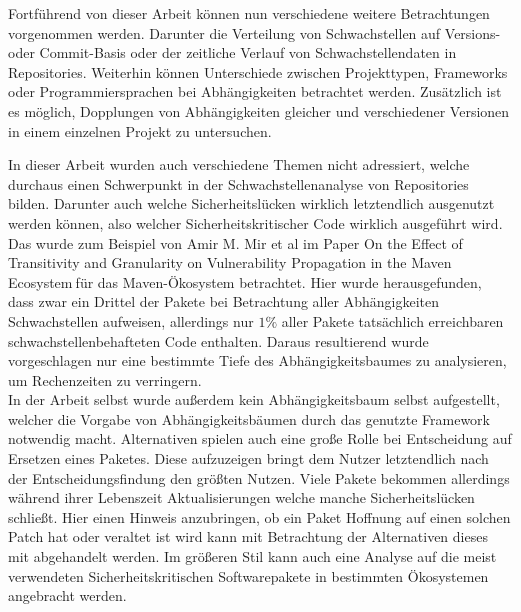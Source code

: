     Fortführend von dieser Arbeit können nun verschiedene weitere Betrachtungen vorgenommen werden.
    Darunter die Verteilung von Schwachstellen auf Versions- oder Commit-Basis oder der zeitliche Verlauf von Schwachstellendaten in Repositories.
    Weiterhin können Unterschiede zwischen Projekttypen, Frameworks oder Programmiersprachen bei Abhängigkeiten betrachtet werden.
    Zusätzlich ist es möglich, Dopplungen von Abhängigkeiten gleicher und verschiedener Versionen in einem einzelnen Projekt zu untersuchen.

    In dieser Arbeit wurden auch verschiedene Themen nicht adressiert, welche durchaus einen Schwerpunkt in der Schwachstellenanalyse von Repositories bilden.
    Darunter auch welche Sicherheitslücken wirklich letztendlich ausgenutzt werden können, also welcher Sicherheitskritischer Code wirklich ausgeführt wird.
    Das wurde zum Beispiel von Amir M. Mir et al im Paper \glqq On the Effect of Transitivity and Granularity on Vulnerability Propagation in the Maven Ecosystem\grqq$~$für das Maven-Ökosystem betrachtet.
    Hier wurde herausgefunden, dass zwar ein Drittel der Pakete bei Betrachtung aller Abhängigkeiten Schwachstellen aufweisen, allerdings nur $1\%$ aller Pakete tatsächlich erreichbaren schwachstellenbehafteten Code enthalten.
    Daraus resultierend wurde vorgeschlagen nur eine bestimmte Tiefe des Abhängigkeitsbaumes zu analysieren, um Rechenzeiten zu verringern.
    \\
    In der Arbeit selbst wurde außerdem kein Abhängigkeitsbaum selbst aufgestellt, welcher die Vorgabe von Abhängigkeitsbäumen durch das genutzte Framework notwendig macht.
    Alternativen spielen auch eine große Rolle bei Entscheidung auf Ersetzen eines Paketes.
    Diese aufzuzeigen bringt dem Nutzer letztendlich nach der Entscheidungsfindung den größten Nutzen.
    Viele Pakete bekommen allerdings während ihrer Lebenszeit Aktualisierungen welche manche Sicherheitslücken schließt.
    Hier einen Hinweis anzubringen, ob ein Paket Hoffnung auf einen solchen Patch hat oder veraltet ist wird kann mit Betrachtung der Alternativen dieses mit abgehandelt werden.
    Im größeren Stil kann auch eine Analyse auf die meist verwendeten Sicherheitskritischen Softwarepakete in bestimmten Ökosystemen angebracht werden. 
